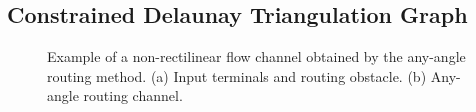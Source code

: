 \documentclass[journal]{IEEEtran}
\begin{document}
\subsection{Constrained Delaunay Triangulation Graph}
\label{sec:dtg}

\begin{figure}[htbp]
\centering
{}%
\hfil
%
\caption{Example of a non-rectilinear flow channel obtained by the any-angle routing method. (a) Input terminals and routing obstacle. (b) Any-angle routing channel.}
\label{fig:DTGExampleAB}
\end{figure}
\end{document}

